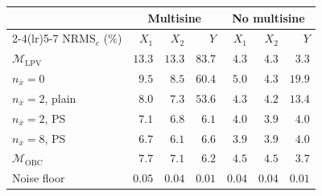 \setlength{\tabcolsep}{3pt}
\begin{tabular}{l r r r r r r }
\toprule
 & \multicolumn{3}{c}{Multisine} & \multicolumn{3}{c}{No multisine}\\
\cmidrule(lr){2-4}\cmidrule(lr){5-7}
$\mathrm{NRMS}_e$ (\%) & $X_1$ & $X_2$ & $Y$ & $X_1$ & $X_2$ & $Y$\\
\midrule
$\mathcal{M}_{\mathrm{LPV}}$ & $13.3$ & $13.3$ & $83.7$ & $4.3$ & $4.3$ & $3.3$\\
$n_{\bar x}=0$ & $9.5$ & $8.5$ & $60.4$ & $5.0$ & $4.3$ & $19.9$\\
$n_{\bar x}=2$, plain & $8.0$ & $7.3$ & $53.6$ & $4.3$ & $4.2$ & $13.4$\\
$n_{\bar x}=2$, PS & $7.1$ & $6.8$ & $6.1$ & $4.0$ & $3.9$ & $4.0$\\
$n_{\bar x}=8$, PS & $6.7$ & $6.1$ & $6.6$ & $3.9$ & $3.9$ & $4.0$\\
\midrule
$\mathcal{M}_{\mathrm{OBC}}$ & $7.7$ & $7.1$ & $6.2$ & $4.5$ & $4.5$ & $3.7$\\
\midrule
Noise floor & $0.05$ & $0.04$ & $0.01$ & $0.04$ & $0.04$ & $0.01$\\
\bottomrule
\end{tabular}
